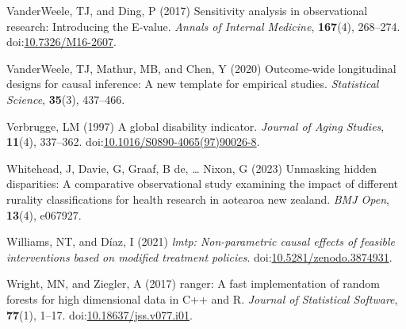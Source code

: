 \documentclass[
  single column]{article}
\newlength{\cslhangindent}
\newenvironment{CSLReferences}[2] %
 {\begin{list}{}{%
  \setlength{\itemindent}{0pt}
  \setlength{\leftmargin}{0pt}
  \setlength{\parsep}{0pt}
  \ifodd #1
   \setlength{\leftmargin}{\cslhangindent}
   \setlength{\itemindent}{-1\cslhangindent}
  \fi
  \setlength{\itemsep}{#2\baselineskip}}}
 {\end{list}}
\begin{document}
\begin{CSLReferences}{1}{0}
VanderWeele, TJ, and Ding, P (2017) Sensitivity analysis in
observational research: Introducing the {E}-value. \emph{Annals of
Internal Medicine}, \textbf{167}(4), 268--274.
doi:\href{https://doi.org/10.7326/M16-2607}{10.7326/M16-2607}.

VanderWeele, TJ, Mathur, MB, and Chen, Y (2020) Outcome-wide
longitudinal designs for causal inference: A new template for empirical
studies. \emph{Statistical Science}, \textbf{35}(3), 437--466.

Verbrugge, LM (1997) A global disability indicator. \emph{Journal of
Aging Studies}, \textbf{11}(4), 337--362.
doi:\href{https://doi.org/10.1016/S0890-4065(97)90026-8}{10.1016/S0890-4065(97)90026-8}.

Whitehead, J, Davie, G, Graaf, B de, \ldots{} Nixon, G (2023) Unmasking
hidden disparities: A comparative observational study examining the
impact of different rurality classifications for health research in
aotearoa new zealand. \emph{BMJ Open}, \textbf{13}(4), e067927.

Williams, NT, and Díaz, I (2021) \emph{{l}mtp: Non-parametric causal
effects of feasible interventions based on modified treatment policies}.
doi:\href{https://doi.org/10.5281/zenodo.3874931}{10.5281/zenodo.3874931}.

Wright, MN, and Ziegler, A (2017) {ranger}: A fast implementation of
random forests for high dimensional data in {C++} and {R}. \emph{Journal
of Statistical Software}, \textbf{77}(1), 1--17.
doi:\href{https://doi.org/10.18637/jss.v077.i01}{10.18637/jss.v077.i01}.

\end{CSLReferences}
\end{document}

